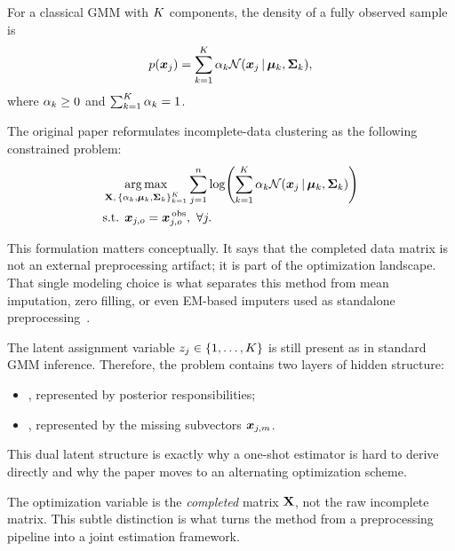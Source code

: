 For a classical GMM with $K$ components, the density of a fully observed sample is
\[
    p\paren*{\vect{x}_j}
    =
    \sum_{k=1}^{\scal{K}}
    \scal{\alpha}_k
    \N\paren*{\vect{x}_j \given \vect{\mu}_k, \mat{\Sigma}_k},
\]
where $\alpha_k \ge 0$ and $\sum_{k=1}^{K} \alpha_k = 1$.

The original paper reformulates incomplete-data clustering as the following constrained problem:
\begin{equation}
\begin{aligned}
    &\argmax_{\mat{X},\, \set*{\scal{\alpha}_k,\vect{\mu}_k,\mat{\Sigma}_k}_{k=1}^{\scal{K}}}
    \sum_{j=1}^{\scal{n}}
    \log\paren*{
        \sum_{k=1}^{\scal{K}}
        \scal{\alpha}_k
        \N\paren*{\vect{x}_j \given \vect{\mu}_k, \mat{\Sigma}_k}
    } \\
    &\text{s.t. }
    \vect{x}_{j,o} = \vect{x}^{\,\text{obs}}_{j,o},\ \forall j.
\end{aligned}
\end{equation}

This formulation matters conceptually. It says that the completed data matrix is not an external preprocessing artifact; it is part of the optimization landscape. That single modeling choice is what separates this method from mean imputation, zero filling, or even EM-based imputers used as standalone preprocessing~\cite{ghahramani1994em,aste2015incomplete}.

The latent assignment variable $z_j \in \lbrace1,\dots,K\rbrace$ is still present as in standard GMM inference. Therefore, the problem contains two layers of hidden structure:
\begin{itemize}
    \item {}, represented by posterior responsibilities;
    \item {}, represented by the missing subvectors $\bm{x}_{j,m}$.
\end{itemize}

This dual latent structure is exactly why a one-shot estimator is hard to derive directly and why the paper moves to an alternating optimization scheme.

\begin{remark}
The optimization variable is the \emph{completed} matrix $\mathbf{X}$, not the raw incomplete matrix. This subtle distinction is what turns the method from a preprocessing pipeline into a joint estimation framework.
\end{remark}
